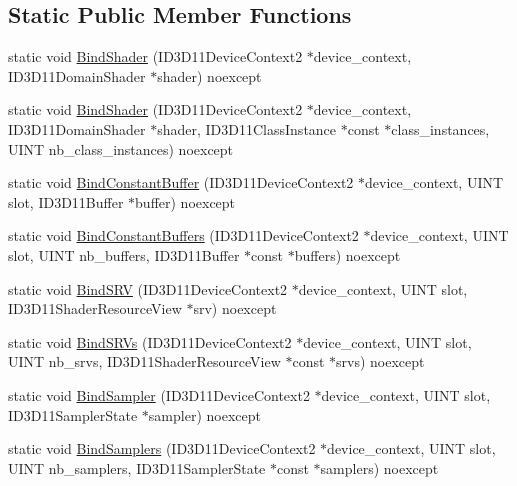 \subsection*{Static Public Member Functions}
\begin{DoxyCompactItemize}
\item 
static void \hyperlink{structmage_1_1_d_s_ac6afe6f6f2be5fa7222ce1ceaff36a9d}{Bind\+Shader} (I\+D3\+D11\+Device\+Context2 $\ast$device\+\_\+context, I\+D3\+D11\+Domain\+Shader $\ast$shader) noexcept
\item 
static void \hyperlink{structmage_1_1_d_s_a5c1d06ea26be1f058d4b4a5b6e69e3c7}{Bind\+Shader} (I\+D3\+D11\+Device\+Context2 $\ast$device\+\_\+context, I\+D3\+D11\+Domain\+Shader $\ast$shader, I\+D3\+D11\+Class\+Instance $\ast$const $\ast$class\+\_\+instances, U\+I\+NT nb\+\_\+class\+\_\+instances) noexcept
\item 
static void \hyperlink{structmage_1_1_d_s_af12ac0e5ba28a14112f2480e9f0aa342}{Bind\+Constant\+Buffer} (I\+D3\+D11\+Device\+Context2 $\ast$device\+\_\+context, U\+I\+NT slot, I\+D3\+D11\+Buffer $\ast$buffer) noexcept
\item 
static void \hyperlink{structmage_1_1_d_s_a8ad706ed6cfc70e35c5203d041d63268}{Bind\+Constant\+Buffers} (I\+D3\+D11\+Device\+Context2 $\ast$device\+\_\+context, U\+I\+NT slot, U\+I\+NT nb\+\_\+buffers, I\+D3\+D11\+Buffer $\ast$const $\ast$buffers) noexcept
\item 
static void \hyperlink{structmage_1_1_d_s_aeca9eda374c8fcff2a9fa034d0464c70}{Bind\+S\+RV} (I\+D3\+D11\+Device\+Context2 $\ast$device\+\_\+context, U\+I\+NT slot, I\+D3\+D11\+Shader\+Resource\+View $\ast$srv) noexcept
\item 
static void \hyperlink{structmage_1_1_d_s_ad26f4ced72688b7632c085dcec19cede}{Bind\+S\+R\+Vs} (I\+D3\+D11\+Device\+Context2 $\ast$device\+\_\+context, U\+I\+NT slot, U\+I\+NT nb\+\_\+srvs, I\+D3\+D11\+Shader\+Resource\+View $\ast$const $\ast$srvs) noexcept
\item 
static void \hyperlink{structmage_1_1_d_s_a66572c8927df9898fc41b9391c6e965b}{Bind\+Sampler} (I\+D3\+D11\+Device\+Context2 $\ast$device\+\_\+context, U\+I\+NT slot, I\+D3\+D11\+Sampler\+State $\ast$sampler) noexcept
\item 
static void \hyperlink{structmage_1_1_d_s_afb8a9194ce9a3ed98612094ada28b4d4}{Bind\+Samplers} (I\+D3\+D11\+Device\+Context2 $\ast$device\+\_\+context, U\+I\+NT slot, U\+I\+NT nb\+\_\+samplers, I\+D3\+D11\+Sampler\+State $\ast$const $\ast$samplers) noexcept
\end{DoxyCompactItemize}
